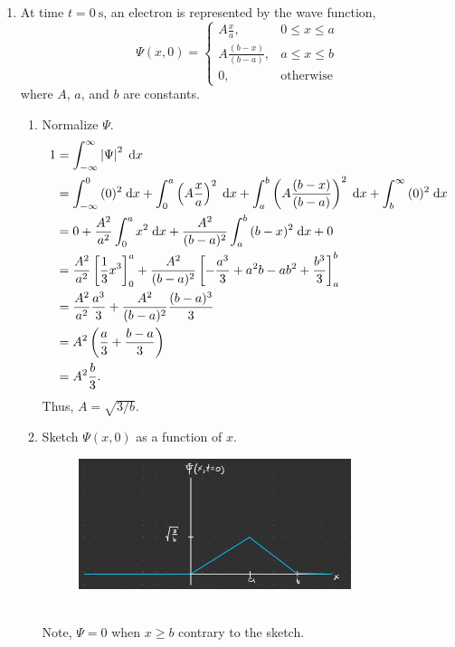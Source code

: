\documentclass[a4paper, 12pt]{config/homework}
\begin{document}
\begin{enumerate}
\pagebreak
\item At time \(t=\qty{0}{\second}\), an electron is represented by the wave function,
\[\Psi(x, 0) = \begin{cases}
    A\frac{x}{a}, & 0 \le x \le a \\
    A \frac{(b-x)}{(b-a)}, & a \le x \le b \\
    0, & \text{otherwise}
\end{cases}\]
where \(A\), \(a\), and \(b\) are constants.
\begin{enumerate}[label=(\alph*)]
\item Normalize \(\Psi \).
\begin{align*}
1 &= \bint{-\infty}{\infty}{\left| \Psi \right|^2}{x}
\\&= \bint{-\infty}{0}{(0)^2}{x} + \bint{0}{a}{\left(A \frac{x}{a}\right)^2}{x} + \bint{a}{b}{\left(A\frac{(b-x)}{(b-a)}\right)^2}{x} + \bint{b}{\infty}{(0)^2}{x}
\\&= 0 + \frac{A^2}{a^2}\bint{0}{a}{x^2}{x} + \frac{A^2}{(b-a)^2}\bint{a}{b}{(b-x)^2}{x} + 0
\\&= \frac{A^2}{a^2} \left[\frac{1}{3}x^3\right]_0^a + \frac{A^2}{(b-a)^2}\left[-\frac{a^3}{3} + a^2b - ab^2 + \frac{b^3}{3}\right]_a^b
\\&= \frac{A^2}{a^2} \frac{a^3}{3} + \frac{A^2}{(b-a)^2}\frac{(b-a)^3}{3}
\\&= A^2 \left(\frac{a}{3} + \frac{b-a}{3}\right)
\\&= A^2 \frac{b}{3}.
\end{align*}
Thus, \(A = \sqrt{3/b}\).

\item Sketch \(\Psi(x,0)\) as a function of \(x\).
\begin{figure}[h]
    \centering
    \includegraphics[width=0.8\textwidth]{qm_hw1_p2b.jpeg}
\end{figure}
\\Note, \(\Psi=0\) when \(x\ge b\) contrary to the sketch.


\end{enumerate}
\end{enumerate}
\end{document}
